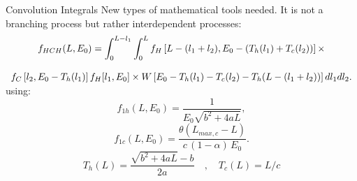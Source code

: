 \documentclass[clock,style=horatio,paper=screen,blackslide,trans=Wipe,mode=present]{powerdot}
\begin{document}
%


\begin{wideslide}[toc=]{Convolution Integrals}
New types of mathematical tools needed. It is not a branching
process but rather interdependent processes: \small \vspace{-1mm}
\[
\begin{array}{c}
\displaystyle  f_{HCH}(L,E_0) = \int^{L-l_{1}}_{0} \int^{L}_{0} f_{H} \left[ L- (l_{1} + l_{2}), E_{0} - (T_{h}(l_{1}) + T_{c}(l_{2})) \right] \times \cr
\cr
\vspace{-2mm}
   f_{C} \left[ l_{2}, E_{0} - T_{h}(l_{1}) \right] f_H [l_{1}, E_0] \times
   W\left[ E_0 - T_h(l_{1}) - T_c(l_{2}) - T_h(L-(l_{1} + l_{2})) \right] dl_1 dl_2.
\end{array}
\]
\normalsize using: \small \vspace{2mm}
\[
f_{1h}(L,E_0 ) = \frac{1}{{E_0 \sqrt {b^2  +
4aL} }},
\]
\[
f_{1c}(L,E_0 ) = \frac{\theta (L_{max,c} -
L)}{{c\,(1 - \alpha)\, E_0}}.
\]
\[
T_h(L) = \frac{{\sqrt {b^2  + 4aL}  -
b}}{{2a}} \quad, \quad T_c(L) = L/c
\]
\end{wideslide}
\end{document}
